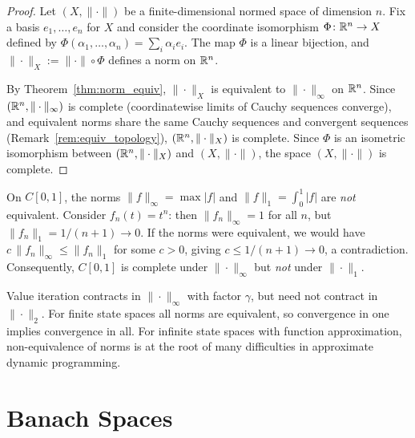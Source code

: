 \documentclass[11pt,a4paper]{article}
\begin{document}
\begin{proof}
Let $(X, \|\cdot\|)$ be a finite-dimensional normed space of dimension $n$.
Fix a basis $e_1, \ldots, e_n$ for $X$ and consider the coordinate
isomorphism $\Phi \colon \mathbb{R}^n \to X$ defined by
$\Phi(\alpha_1, \ldots, \alpha_n) = \sum_i \alpha_i e_i$. The map $\Phi$
is a linear bijection, and $\|\cdot\|_X := \|\cdot\| \circ \Phi$ defines a
norm on $\mathbb{R}^n$.

By Theorem~\ref{thm:norm_equiv}, $\|\cdot\|_X$ is equivalent to
$\|\cdot\|_\infty$ on $\mathbb{R}^n$. Since $(\mathbb{R}^n, \|\cdot\|_\infty)$ is complete
(coordinatewise limits of Cauchy sequences converge), and equivalent norms
share the same Cauchy sequences and convergent sequences
(Remark~\ref{rem:equiv_topology}), $(\mathbb{R}^n, \|\cdot\|_X)$ is complete. Since
$\Phi$ is an isometric isomorphism between $(\mathbb{R}^n, \|\cdot\|_X)$ and
$(X, \|\cdot\|)$, the space $(X, \|\cdot\|)$ is complete.
\end{proof}

\begin{warning}[title={Norms on Infinite-Dimensional Spaces Are Not Equivalent}]
\label{warn:inf_dim_norms}
On $C[0,1]$, the norms $\|f\|_\infty = \max |f|$ and
$\|f\|_1 = \int_0^1 |f|$ are \emph{not} equivalent. Consider
$f_n(t) = t^n$: then $\|f_n\|_\infty = 1$ for all $n$, but
$\|f_n\|_1 = 1/(n+1) \to 0$. If the norms were equivalent, we would have
$c \, \|f_n\|_\infty \le \|f_n\|_1$ for some $c > 0$, giving $c \le 1/(n+1)
\to 0$, a contradiction. Consequently, $C[0,1]$ is complete under
$\|\cdot\|_\infty$ but \emph{not} under $\|\cdot\|_1$.
\end{warning}

\begin{rlconnection}[title={Norm Choice in RL}]
Value iteration contracts in $\|\cdot\|_\infty$ with factor $\gamma$, but
need not contract in $\|\cdot\|_2$. For finite state spaces all norms are
equivalent, so convergence in one implies convergence in all. For infinite
state spaces with function approximation, non-equivalence of norms is at the
root of many difficulties in approximate dynamic programming.
\end{rlconnection}


\section{Banach Spaces}
\label{sec:banach}
\end{document}
